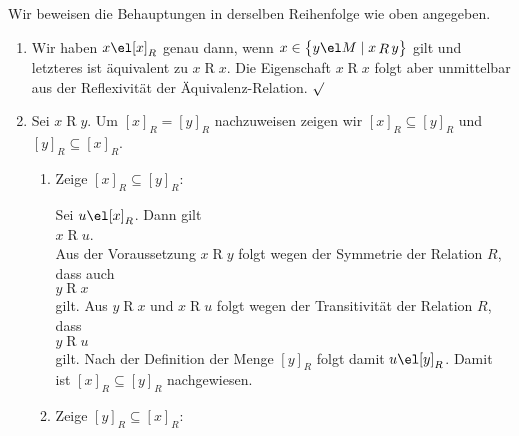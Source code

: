 \proof
Wir beweisen die Behauptungen in derselben Reihenfolge wie oben angegeben.
\begin{enumerate}
\item Wir haben $x \el [x]_R$ genau dann, wenn 
      $x \in \bigl\{ y \el M \mid x \mathop{R} y \bigr\}$ gilt und letzteres ist
      \"{a}quivalent zu $x \mathop{R} x$.
      Die Eigenschaft $x \mathop{R} x$ folgt aber unmittelbar aus der Reflexivit\"{a}t der \"{A}quivalenz-Relation. $\surd$
\item Sei  $x \mathop{R} y$.  Um $[x]_R = [y]_R$ nachzuweisen zeigen wir
      $[x]_R \subseteq [y]_R$ und $[y]_R \subseteq [x]_R$.

      \begin{enumerate}
      \item Zeige $[x]_R \subseteq [y]_R$:
        
            Sei $u \el [x]_R$.  Dann gilt
            \\[0.2cm]
            \hspace*{1.3cm}
            $x \mathop{R} u$.  
            \\[0.2cm]
            Aus der Voraussetzung
            $x \mathop{R} y$ folgt wegen der Symmetrie der Relation $R$, dass auch
            \\[0.2cm]
            \hspace*{1.3cm}
            $y \mathop{R} x$ 
            \\[0.2cm]
            gilt.  Aus 
            $y \mathop{R} x$ und $x \mathop{R} u$ folgt wegen der Transitivit\"{a}t der Relation
            $R$, dass
            \\[0.2cm]
            \hspace*{1.3cm}
            $y \mathop{R} u$ 
            \\[0.2cm]
            gilt.  Nach der Definition der
            Menge $[y]_R$ folgt damit $u \el [y]_R$. 
            Damit ist $[x]_R \subseteq [y]_R$ nachgewiesen.
      \item Zeige $[y]_R \subseteq [x]_R$:


\end{enumerate}
\end{enumerate}
